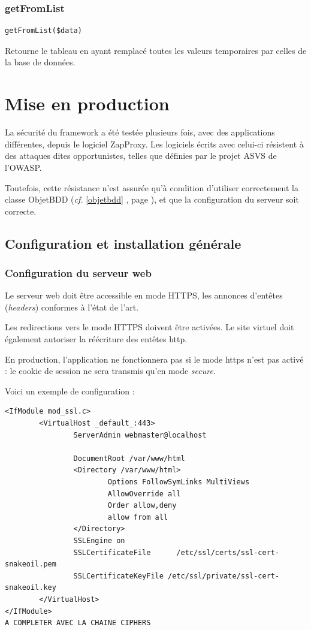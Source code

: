 \subsection{getFromList}
\begin{lstlisting}
getFromList($data)
\end{lstlisting}
Retourne le tableau en ayant remplacé toutes les valeurs temporaires par celles de la base de données.



\chapter{Mise en production}

La sécurité du framework a été testée plusieurs fois, avec des applications différentes, depuis le logiciel ZapProxy. Les logiciels écrits avec celui-ci résistent à des attaques dites opportunistes, telles que définies par le projet ASVS de l'OWASP.

Toutefois, cette résistance n'est assurée qu'à condition d'utiliser correctement la classe ObjetBDD (\textit{cf.} \ref{objetbdd} \textit{}, page \pageref{objetbdd}), et que la configuration du serveur soit correcte.

\section{Configuration et installation générale}

\subsection{Configuration du serveur web}

Le serveur web doit être accessible en mode HTTPS, les annonces d'entêtes (\textit{headers}) conformes à l'état de l'art.

Les redirections vers le mode HTTPS doivent être activées. Le site virtuel doit également autoriser la réécriture des entêtes http.

En production, l'application ne fonctionnera pas si le mode https n'est pas activé : le cookie de session ne sera transmis qu'en mode \textit{secure}.

Voici un exemple de configuration :

\begin{lstlisting}
<IfModule mod_ssl.c>
        <VirtualHost _default_:443>
                ServerAdmin webmaster@localhost

                DocumentRoot /var/www/html
                <Directory /var/www/html>
                        Options FollowSymLinks MultiViews
                        AllowOverride all
                        Order allow,deny
                        allow from all
                </Directory>
                SSLEngine on
                SSLCertificateFile      /etc/ssl/certs/ssl-cert-snakeoil.pem
                SSLCertificateKeyFile /etc/ssl/private/ssl-cert-snakeoil.key
        </VirtualHost>
</IfModule>
A COMPLETER AVEC LA CHAINE CIPHERS
\end{lstlisting}

